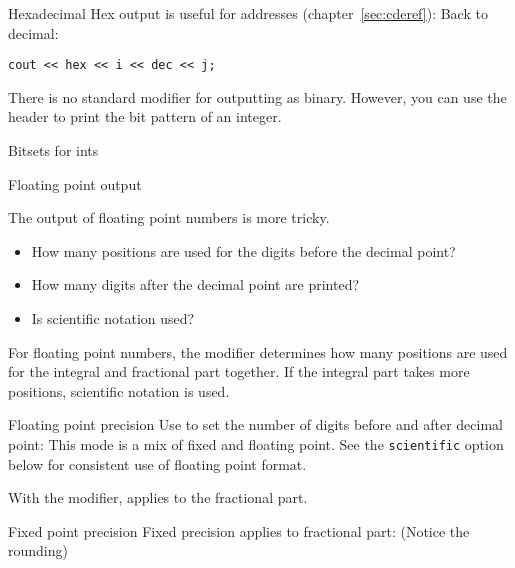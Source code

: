 \begin{block}{Hexadecimal}
  \label{sl:io-hex}
  Hex output is useful for addresses (chapter~\ref{sec:cderef}):
  Back to decimal:
\begin{lstlisting}
cout << hex << i << dec << j;
\end{lstlisting}
\end{block}

There is no standard modifier for outputting as binary.
However, you can use the  header
to print the bit pattern of an integer.

\begin{block}{Bitsets for ints}
\end{block}

 {Floating point output}

The output of floating point numbers is more tricky.
\begin{itemize}
\item How many positions are used for the digits before the decimal point?
\item How many digits after the decimal point are printed?
\item Is scientific notation used?
\end{itemize}

For floating point numbers, the  modifier
determines how many positions are used for the integral and fractional part
together. If the integral part takes more positions, scientific notation is used.

\begin{block}{Floating point precision}
  \label{sl:io-float}
  Use  to set the number of digits before and after
  decimal point:
  This mode is a mix of fixed and floating point.
  See the \lstinline{scientific} option below
  for consistent use of floating point format.
\end{block}

With the  modifier, 
applies to the fractional part.

\begin{block}{Fixed point precision}
  \label{sl:io-fix}
  Fixed precision applies to fractional part:
  (Notice the rounding)
\end{block}

